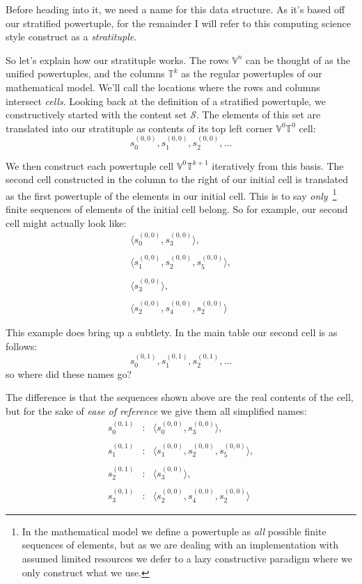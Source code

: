 \documentclass[twoside]{article}
\newcommand{\nthpt}[2][T]{\ensuremath{\mathbb{#1}^{#2}}}
\newcommand{\nthut}[2][V]{\ensuremath{\mathbb{#1}^{#2}}}
\newcommand{\sifter}[3]{\ensuremath{s^{(#1, #2)}_{#3}}}
\begin{document}
Before heading into it, we need a name for this data structure. As it's based off our stratified powertuple,
for the remainder I will refer to this computing science style construct as a \emph{stratituple}.

So let's explain how our stratituple works. The rows $ \nthut{n} $ can be thought of as the unified powertuples,
and the columns $ \nthpt{k} $ as the regular powertuples of our mathematical model. We'll call the locations where
the rows and columns intersect \emph{cells}. Looking back at the definition of a stratified powertuple, we constructively
started with the content set $ \mathcal{S} $. The elements of this set are translated into our stratituple as contents
of its top left corner $ \nthut{0}\nthpt{0} $ cell:
$$ \sifter{0}{0}{0}, \sifter{0}{0}{1}, \sifter{0}{0}{2}, \ldots $$

We then construct each powertuple cell $ \nthut{0}\nthpt{k+1} $ iteratively from this basis. The second cell constructed
in the column to the right of our initial cell is translated as the first powertuple of the elements in our initial cell.
This is to say \emph{only}\ \footnote{In the mathematical model we define a powertuple as \emph{all} possible finite sequences
of elements, but as we are dealing with an implementation with assumed limited resources we defer to a lazy constructive paradigm
where we only construct what we use.} finite sequences of elements of the initial cell belong. So for example,
our second cell might actually look like:
$$ \begin{array}{l}
\langle\sifter{0}{0}{0}, \sifter{0}{0}{3}\rangle,			\\
									\\
\langle\sifter{0}{0}{1}, \sifter{0}{0}{2}, \sifter{0}{0}{5}\rangle,	\\
									\\
\langle\sifter{0}{0}{3}\rangle,						\\
									\\
\langle\sifter{0}{0}{2}, \sifter{0}{0}{4}, \sifter{0}{0}{2}\rangle
\end{array} $$

This example does bring up a subtlety. In the main table our second cell is as follows:
$$ \sifter{0}{1}{0}, \sifter{0}{1}{1}, \sifter{0}{1}{2}, \ldots $$
so where did these names go?

The difference is that the sequences shown above are the real contents of the cell,
but for the sake of \emph{ease of reference} we give them all simplified names:
$$ \begin{array}{rcl}
\sifter{0}{1}{0} & : & \langle\sifter{0}{0}{0}, \sifter{0}{0}{3}\rangle,			\\
		       										\\
\sifter{0}{1}{1} & : & \langle\sifter{0}{0}{1}, \sifter{0}{0}{2}, \sifter{0}{0}{5}\rangle,	\\
		       										\\
\sifter{0}{1}{2} & : & \langle\sifter{0}{0}{3}\rangle,						\\
		       										\\
\sifter{0}{1}{3} & : & \langle\sifter{0}{0}{2}, \sifter{0}{0}{4}, \sifter{0}{0}{2}\rangle
\end{array} $$
\end{document}
